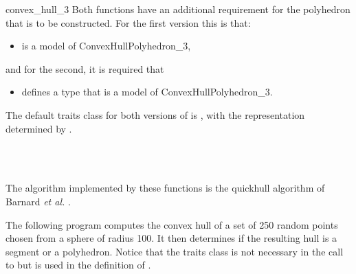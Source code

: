 \begin{ccRefFunction}{convex_hull_3}
Both functions have an additional requirement for the polyhedron that is
to be constructed. For the first version this is that:
\begin{itemize}
  \item {} is a model of ConvexHullPolyhedron\_3,
\end{itemize}
and for the second, it is required that
\begin{itemize}
 \item {} defines a type  that is a model of 
       ConvexHullPolyhedron\_3.
\end{itemize}

The default traits class for both versions of  is 
,%
with the representation  determined by .

\ccSeeAlso

 \\
  \\

\ccImplementation
The algorithm implemented by these functions is the quickhull algorithm of 
Barnard \textit{et al.} \cite{bdh-qach-96}.  

\ccExample

The following program computes the convex hull of a set of 250 random
points chosen from a sphere of radius 100.  It then determines if the resulting
hull is a segment or a polyhedron.  Notice that the traits class is not
necessary in the call to  but is used in the definition
of .


\end{ccRefFunction}
